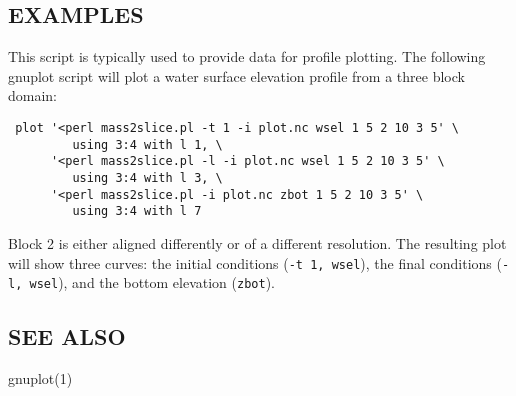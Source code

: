 \subsection*{EXAMPLES\label{mass2slice_pl_EXAMPLES}}

This script is typically used to provide data for profile plotting.  The following gnuplot script will plot a water surface elevation profile from a three block domain:

\begin{verbatim}
 plot '<perl mass2slice.pl -t 1 -i plot.nc wsel 1 5 2 10 3 5' \
         using 3:4 with l 1, \
      '<perl mass2slice.pl -l -i plot.nc wsel 1 5 2 10 3 5' \
         using 3:4 with l 3, \
      '<perl mass2slice.pl -i plot.nc zbot 1 5 2 10 3 5' \
         using 3:4 with l 7
\end{verbatim}


Block 2 is either aligned differently or of a different resolution.
The resulting plot will show three curves: the initial conditions
(\texttt{-t 1, wsel}), the final conditions (\texttt{-l, wsel}), and the bottom
elevation (\texttt{zbot}).

\subsection*{SEE ALSO\label{mass2slice_pl_SEE_ALSO}}

gnuplot(1)


